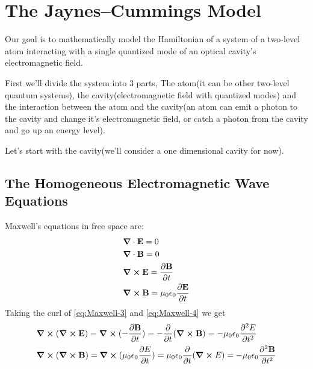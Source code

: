\documentclass[english, a4paper, 12pt, twoside]{article}
\numberwithin{equation}{section} %
\begin{document}
\newpage

\appendix
\section{The Jaynes–Cummings Model}
Our goal is to mathematically model the Hamiltonian of a system of a two-level atom interacting with a single quantized mode of an optical cavity's electromagnetic field. %
\par
First we'll divide the system into 3 parts, The atom(it can be other two-level quantum systems), the cavity(electromagnetic field with quantized modes) and the interaction between the atom and the cavity(an atom can emit a photon to the cavity and change it's electromagnetic field, or catch a photon from the cavity and go up an energy level).\par  %
Let's start with the cavity(we'll consider a one dimensional cavity for now). 
\subsection{The Homogeneous Electromagnetic Wave Equations}
Maxwell's equations in free space are:
\begin{subequations}
    \label{eq:optim}
    \begin{align}
        &\grad \cdot \textbf{E} = 0 \label{eq:Maxwell-1}\\
        &\grad \cdot \textbf{B} = 0 \label{eq:Maxwell-2}\\
        &\grad \cross \textbf{E} = \frac{\partial\textbf{B}}{\partial t} \label{eq:Maxwell-3}\\
        &\grad \cross \textbf{B} = \mu_0 \epsilon_0 \frac{\partial\textbf{E}}{\partial t} \label{eq:Maxwell-4}
    \end{align}
\end{subequations}
Taking the curl of \ref{eq:Maxwell-3} and \ref{eq:Maxwell-4} we get
\begin{subequations} 
\label{eq:curl-}
    \begin{align}
        &\curl{(\curl{\textbf{E}})} 
        = \curl{(-\frac{\partial \textbf{B}}{\partial t})} 
        = -\frac{\partial}{\partial t}(\curl{\textbf{B}})
        = - \mu_0 \epsilon_0 \frac{\partial^2 E}{\partial t^2} 
        \label{eq:curl-E}\\
        &\curl{(\curl{\textbf{B}})} 
        = \curl{(\mu_0 \epsilon_0 \frac{\partial E}{\partial t})} 
        = \mu_0 \epsilon_0\frac{\partial}{\partial t}(\curl{E}) 
        = - \mu_0 \epsilon_0 \frac{\partial^2 \textbf{B}}{\partial t^2} 
        \label{eq:curl-B}
    \end{align}
\end{subequations}
   
\end{document}
